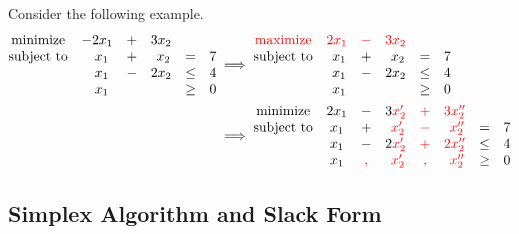 \begin{example}
    Consider the following example.
    \begin{align*}
        \begin{matrix}
            \text{minimize}   & -2x_1 & + & 3x_2            \\
            \text{subject to} & ~~x_1 & + & ~x_2 & =    & 7 \\
                              & ~~x_1 & - & 2x_2 & \leq & 4 \\
                              & ~~x_1 &   &      & \geq & 0
        \end{matrix} & \implies
        \begin{matrix}
            \color{red}\text{maximize} & \color{red} 2x_1 & \color{red}- & \color{red} 3x_2            \\
            \text{subject to}          &             ~x_1 & +            &             ~x_2 & =    & 7 \\
                                       &             ~x_1 & -            &             2x_2 & \leq & 4 \\
                                       &             ~x_1 &              &                  & \geq & 0
        \end{matrix} \\ & \implies
        \begin{matrix}
            \text{minimize}   & 2x_1 & -            & 3\color{red}x_2' & \color{red}+ & \color{red}3x_2''            \\
            \text{subject to} & x_1  & +            & \color{red}~x_2' & \color{red}- & \color{red}~x_2'' & =    & 7 \\
                              & x_1  & -            & 2\color{red}x_2' & \color{red}+ & \color{red}2x_2'' & \leq & 4 \\
                              & x_1  & \color{red}, & \color{red}~x_2' & \color{red}, & \color{red}~x_2'' & \geq & 0
        \end{matrix}
    \end{align*}
\end{example}

\subsection{Simplex Algorithm and Slack Form}

